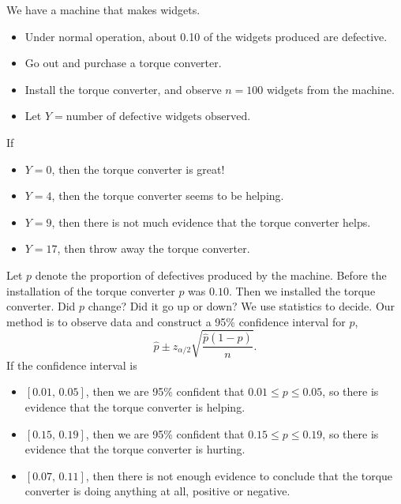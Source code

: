\documentclass[captions=tableheading]{scrbook}
\begin{document}
\begin{example}
\label{exa:widget-machine}

We have a machine that makes widgets. 

\begin{itemize}
\item Under normal operation, about 0.10 of the widgets produced are defective.
\item Go out and purchase a torque converter.
\item Install the torque converter, and observe \(n=100\) widgets from the machine.
\item Let \(Y=\mbox{number of defective widgets observed}\).
\end{itemize}

If

\begin{itemize}
\item \(Y=0\), then the torque converter is great!
\item \(Y=4\), then the torque converter seems to be helping.
\item \(Y=9\), then there is not much evidence that the torque converter helps.
\item \(Y=17\), then throw away the torque converter.
\end{itemize}

Let \(p\) denote the proportion of defectives produced by the machine. Before the installation of the torque converter \(p\) was \(0.10\). Then we installed the torque converter. Did \(p\) change? Did it go up or down? We use statistics to decide. Our method is to observe data and construct a 95\% confidence interval for \(p\),
\begin{equation}
\hat{p}\pm z_{\alpha/2}\sqrt{\frac{\hat{p}(1-\hat{p})}{n}}.
\end{equation}
If the confidence interval is 
\begin{itemize}
\item \([0.01,\,0.05]\), then we are 95\% confident that \(0.01\leq p\leq0.05\), so there is evidence that the torque converter is helping.
\item \([0.15,\,0.19]\), then we are 95\% confident that \(0.15\leq p\leq0.19\), so there is evidence that the torque converter is hurting.
\item \([0.07,\,0.11]\), then there is not enough evidence to conclude that the torque converter is doing anything at all, positive or negative.
\end{itemize}

\end{example}
\end{document}

